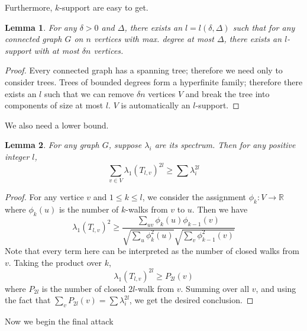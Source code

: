 \documentclass{article}
\theoremstyle{definition} %
\theoremstyle{plain} %
\newtheorem{lemma}{Lemma}
\begin{document}
Furthermore, $k$-support are easy to get.
\begin{lemma}
For any $\delta > 0$ and $\Delta$, there exists an $l = l(\delta, \Delta)$ such that for any connected graph $G$ on $n$ vertices with max. degree at most $\Delta$, there exists an $l$-support with at most $\delta n$ vertices.
\end{lemma}
\begin{proof}
Every connected graph has a spanning tree; therefore we need only to consider trees. Trees of bounded degrees form a hyperfinite family; therefore there exists an $l$ such that we can remove $\delta n$ vertices $V$ and break the tree into components of size at most $l$. $V$ is automatically an $l$-support.
\end{proof}
We also need a lower bound.
\begin{lemma}
For any graph $G$, suppose $\lambda_i$ are its spectrum. Then for any positive integer $l$,
$$\sum_{v\in V}\lambda_1(T_{l,v})^{2l} \geq \sum \lambda_i^{2l}$$
\end{lemma}
\begin{proof}
For any vertice $v$ and $1\leq k\leq l$, we consider the assignment $\phi_k:V\to\mathbb{R}$ where $\phi_k(u)$ is the number of $k$-walks from $v$ to $u$. Then we have
$$\lambda_1(T_{l,v})^2 \geq \frac{\sum_{uv}\phi_k(u)\phi_{k-1}(v)}{\sqrt{\sum_{u}\phi_k^2(u)}\sqrt{\sum_{v}\phi_{k-1}^2(v)}}$$
Note that every term here can be interpreted as the number of closed walks from $v$. Taking the product over $k$,
$$\lambda_1(T_{l,v})^{2l} \geq P_{2l}(v)$$
where $P_{2l}$ is the number of closed $2l$-walk from $v$. Summing over all $v$, and using the fact that $\sum_v P_{2l}(v) = \sum \lambda_i^{2l}$, we get the desired conclusion.
\end{proof}
Now we begin the final attack
\end{document}
